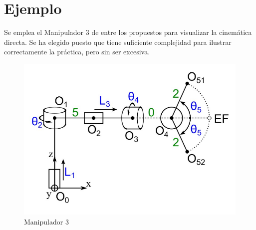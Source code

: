 \section{Ejemplo}
Se emplea el Manipulador 3 de entre los propuestos para visualizar la cinemática directa. Se ha elegido puesto que tiene suficiente complejidad para ilustrar correctamente la práctica, pero sin ser excesiva.
\begin{figure}[htb]
   \centering
   \includegraphics[width=0.6\linewidth]{images/cin_dir_2.png}
   \caption{Manipulador 3}
   \label{chapter:manipulador3}
\end{figure}


